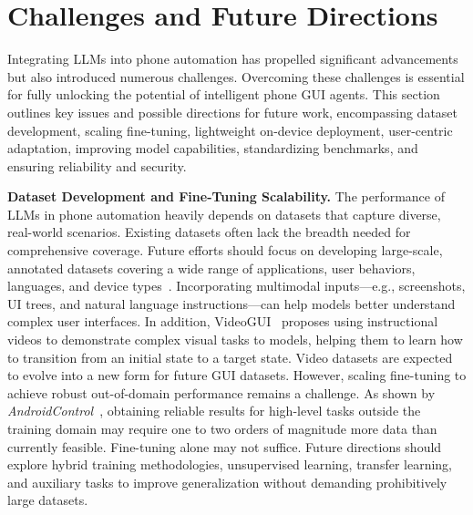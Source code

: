 \section{Challenges and Future Directions}
\label{sec:challenges}

Integrating LLMs into phone automation has propelled significant advancements but also introduced numerous challenges. Overcoming these challenges is essential for fully unlocking the potential of intelligent phone GUI agents. This section outlines key issues and possible directions for future work, encompassing dataset development, scaling fine-tuning, lightweight on-device deployment, user-centric adaptation, improving model capabilities, standardizing benchmarks, and ensuring reliability and security.


\noindent\textbf{Dataset Development and Fine-Tuning Scalability.}
The performance of LLMs in phone automation heavily depends on datasets that capture diverse, real-world scenarios. Existing datasets often lack the breadth needed for comprehensive coverage. Future efforts should focus on developing large-scale, annotated datasets covering a wide range of applications, user behaviors, languages, and device types~\cite{rawles2024androidinthewild, zhang2024aitz}. Incorporating multimodal inputs—e.g., screenshots, UI trees, and natural language instructions—can help models better understand complex user interfaces. In addition, VideoGUI~\cite{lin2024videogui} proposes using instructional videos to demonstrate complex visual tasks to models, helping them to learn how to transition from an initial state to a target state. Video datasets are expected to evolve into a new form for future GUI datasets.
However, scaling fine-tuning to achieve robust out-of-domain performance remains a challenge. As shown by \textit{AndroidControl}~\cite{li2024androidcontrol}, obtaining reliable results for high-level tasks outside the training domain may require one to two orders of magnitude more data than currently feasible. Fine-tuning alone may not suffice. Future directions should explore hybrid training methodologies, unsupervised learning, transfer learning, and auxiliary tasks to improve generalization without demanding prohibitively large datasets.


